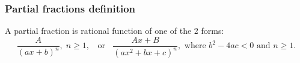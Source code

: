 
\begin{frame}
\frametitle{Partial fractions definition}
\begin{definition} 
A partial fraction is rational function of one of the 2 forms:  
\[
\frac{A}{(ax+b)^n},\;  n\geq 1, \;\;\textrm{ or }\;\;
 \frac{Ax+B}{(ax^{2}+bx+c)^n}, \text{ where }  b^2-4ac<0  \text{ and }  n\geq 1.
\]  
\end{definition}
\end{frame}


